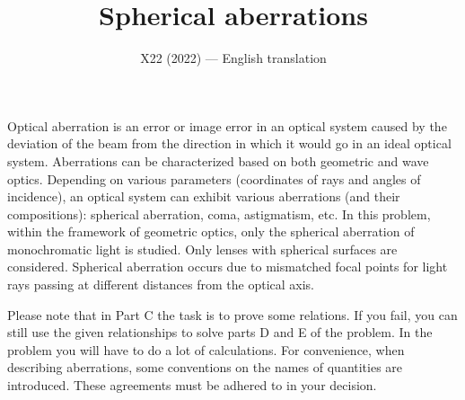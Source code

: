 \documentclass[11pt,a4paper]{article}
\title{\textbf{Spherical aberrations}}
\author{\normalsize X22 (2022) --- English translation}
\date{}
\begin{document}
\maketitle

Optical aberration is an error or image error in an optical system caused by the deviation of the beam from the direction in which it would go in an ideal optical system. Aberrations can be characterized based on both geometric and wave optics. Depending on various parameters (coordinates of rays and angles of incidence), an optical system can exhibit various aberrations (and their compositions): spherical aberration, coma, astigmatism, etc. In this problem, within the framework of geometric optics, only the spherical aberration of monochromatic light is studied. Only lenses with spherical surfaces are considered. Spherical aberration occurs due to mismatched focal points for light rays passing at different distances from the optical axis.

Please note that in Part C the task is to prove some relations. If you fail, you can still use the given relationships to solve parts D and E of the problem. In the problem you will have to do a lot of calculations. For convenience, when describing aberrations, some conventions on the names of quantities are introduced. These agreements must be adhered to in your decision.
\end{document}
